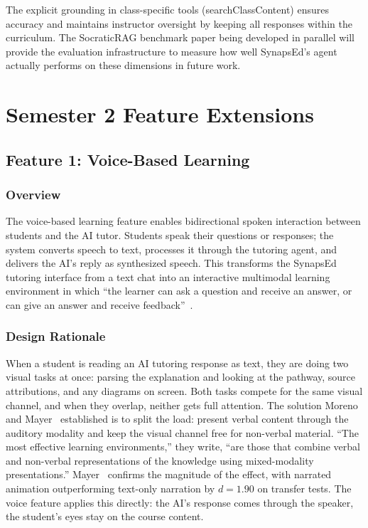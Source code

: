 \documentclass{stylefiles/capstone}
\begin{document}
The explicit grounding in class-specific tools (searchClassContent) ensures accuracy and maintains instructor oversight by keeping all responses within the curriculum. The SocraticRAG benchmark paper being developed in parallel will provide the evaluation infrastructure to measure how well SynapsEd's agent actually performs on these dimensions in future work.

\section{Semester 2 Feature Extensions}
\label{sec:s2features}

\subsection{Feature 1: Voice-Based Learning}

\subsubsection{Overview}

The voice-based learning feature enables bidirectional spoken interaction between students and the AI tutor. Students speak their questions or responses; the system converts speech to text, processes it through the tutoring agent, and delivers the AI's reply as synthesized speech. This transforms the SynapsEd tutoring interface from a text chat into an interactive multimodal learning environment in which ``the learner can ask a question and receive an answer, or can give an answer and receive feedback''~\cite{moreno2007interactive}.

\subsubsection{Design Rationale}

When a student is reading an AI tutoring response as text, they are doing two visual tasks at once: parsing the explanation and looking at the pathway, source attributions, and any diagrams on screen. Both tasks compete for the same visual channel, and when they overlap, neither gets full attention. The solution Moreno and Mayer~\cite{moreno2007interactive} established is to split the load: present verbal content through the auditory modality and keep the visual channel free for non-verbal material. ``The most effective learning environments,'' they write, ``are those that combine verbal and non-verbal representations of the knowledge using mixed-modality presentations.'' Mayer~\cite{mayer2021instructional} confirms the magnitude of the effect, with narrated animation outperforming text-only narration by $d = 1.90$ on transfer tests. The voice feature applies this directly: the AI's response comes through the speaker, the student's eyes stay on the course content.
\end{document}
